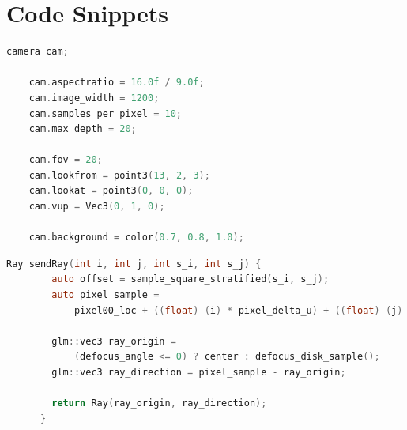 \documentclass[../main.tex]{subfiles}
\begin{document}
\appendix
\section{Code Snippets}
\begin{lstlisting}[language=C,caption="Camera settings"]
    camera cam;

    cam.aspectratio = 16.0f / 9.0f;
    cam.image_width = 1200;
    cam.samples_per_pixel = 10;
    cam.max_depth = 20;

    cam.fov = 20;
    cam.lookfrom = point3(13, 2, 3);
    cam.lookat = point3(0, 0, 0);
    cam.vup = Vec3(0, 1, 0);

    cam.background = color(0.7, 0.8, 1.0);

\end{lstlisting}
\begin{lstlisting}[language=C, caption="Generation of Rays", breaklines=true]
    Ray sendRay(int i, int j, int s_i, int s_j) {
        auto offset = sample_square_stratified(s_i, s_j);
        auto pixel_sample =
            pixel00_loc + ((float) (i) * pixel_delta_u) + ((float) (j) * pixel_delta_v);
    
        glm::vec3 ray_origin =
            (defocus_angle <= 0) ? center : defocus_disk_sample();
        glm::vec3 ray_direction = pixel_sample - ray_origin;
    
        return Ray(ray_origin, ray_direction);
      }    
\end{lstlisting}
\end{document}
